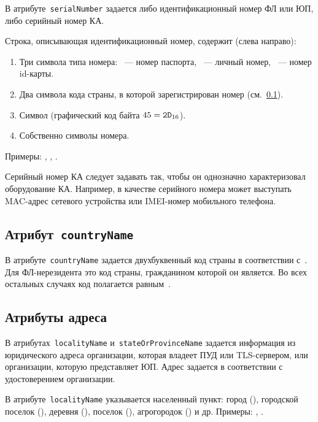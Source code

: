 В атрибуте~\texttt{serialNumber} задается либо идентификационный номер ФЛ 
или ЮП, либо серийный номер КА. 

Строка, описывающая идентификационный номер, содержит (слева направо):
\begin{enumerate}
\item
Три символа типа номера:
~--- номер паспорта, 
~--- личный номер, 
~--- номер id-карты.

\item
Два символа кода страны, в которой зарегистрирован номер 
(см.~\ref{ENTITIES.Id.C}).
\item
Символ \str{-} (графический код байта $45=\texttt{2D}_{16}$).
\item
Собственно символы номера.
\end{enumerate}

Примеры: , 
, 
.

Серийный номер КА следует задавать так, чтобы он однозначно 
характеризовал оборудование КА. Например, в качестве серийного номера 
может выступать MAC-адрес сетевого устройства или IMEI-номер мобильного 
телефона. 

\subsection{Атрибут~\texttt{countryName}}\label{ENTITIES.Id.C}

В атрибуте~\texttt{countryName} задается двухбуквенный код страны
в соответствии с~\cite{CountryCodes}. 
%
Для ФЛ-нерезидента это код страны, гражданином которой он является.
Во всех остальных случаях код полагается равным~.

\subsection{Атрибуты адреса}\label{ENTITIES.Id.L}

В атрибутах~\texttt{localityName} и~\texttt{stateOrProvinceName} 
задается информация из юридического адреса организации,
которая владеет ПУД или TLS-сервером, или организации, 
которую представляет ЮП.
%
Адрес задается в соответствии с удостоверением организации. 

В атрибуте~\texttt{localityName} указывается населенный пункт:
город (), городской поселок (), 
деревня (), поселок (), 
агрогородок () и др. 
%
Примеры: , .

